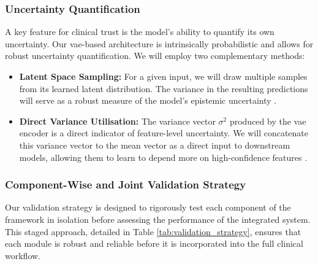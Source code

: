 \documentclass[11pt, a4paper]{article}
\begin{document}
\subsubsection{Uncertainty Quantification}
A key feature for clinical trust is the model's ability to quantify its own uncertainty. Our \gls{vae}-based architecture is intrinsically probabilistic and allows for robust uncertainty quantification. We will employ two complementary methods:
\begin{itemize}
    \item \textbf{Latent Space Sampling:} For a given input, we will draw multiple samples from its learned latent distribution. The variance in the resulting predictions will serve as a robust measure of the model's epistemic uncertainty \cite{BustinMeyer2025}.
    \item \textbf{Direct Variance Utilisation:} The variance vector $\sigma^2$ produced by the \gls{vae} encoder is a direct indicator of feature-level uncertainty. We will concatenate this variance vector to the mean vector as a direct input to downstream models, allowing them to learn to depend more on high-confidence features \cite{FriedrichFrisch2024}.
\end{itemize}

\subsubsection{Component-Wise and Joint Validation Strategy}
Our validation strategy is designed to rigorously test each component of the framework in isolation before assessing the performance of the integrated system. This staged approach, detailed in Table \ref{tab:validation_strategy}, ensures that each module is robust and reliable before it is incorporated into the full clinical workflow.
\end{document}
